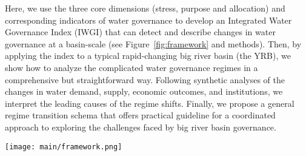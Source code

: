 Here, we use the three core dimensions (stress, purpose and allocation) and corresponding indicators of water governance to develop an Integrated Water Governance Index (IWGI) that can detect and describe changes in water governance at a basin-scale (see Figure~\ref{fig:framework} and methods).
Then, by applying the index to a typical rapid-changing big river basin (the YRB), we show how to analyze the complicated water governance regimes in a comprehensive but straightforward way.
Following synthetic analyses of the changes in water demand, supply, economic outcomes, and institutions, we interpret the leading causes of the regime shifts.
Finally, we propose a general regime transition schema that offers practical guideline for a coordinated approach to exploring the challenges faced by big river basin governance.

\begin{figure*}[!ht]
	\centering
	\texttt{[image: main/framework.png]}
	\caption{
		Identifying the water governance regimes in transitions of a hydrosocial cycle.
		\textbf{A.} Water governance has three key dimensions (stress, purpose and allocation), each of which has two potential directions (denoted in red) when changing. (1) ``stress'' of water shifts between scarcity and abundance; (2) weighting ``purpose'' of water between consumptive services or non-consumptive uses; (3) ``allocation'' changes between balanced or lopsided.
		\textbf{B.} Along with a transition in hydrosocial water cycle, water governance shifts in line with the three dimensions. Combining corresponding indicators, an abrupt change of the IWGI thus indicates a regime shift in water governance.
	}
	\label{fig:framework}
\end{figure*}
